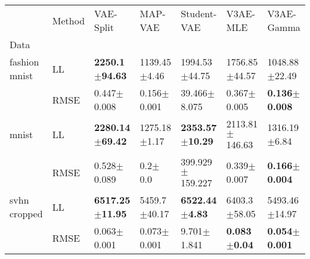 \begin{tabular}{lllllll}
\toprule
             & Method &                   VAE-Split &           MAP-VAE &                 Student-VAE &                 V3AE-MLE &                V3AE-Gamma \\
Data & {} &                             &                   &                             &                          &                           \\
\midrule
fashion mnist & LL &   \textbf{2250.1$\pm$94.63} &  1139.45$\pm$4.46 &           1994.53$\pm$44.75 &        1756.85$\pm$44.57 &         1048.88$\pm$22.49 \\
             & RMSE &             0.447$\pm$0.008 &   0.156$\pm$0.001 &            39.466$\pm$8.075 &          0.367$\pm$0.005 &  \textbf{0.136$\pm$0.008} \\
mnist & LL &  \textbf{2280.14$\pm$69.42} &  1275.18$\pm$1.17 &  \textbf{2353.57$\pm$10.29} &       2113.81$\pm$146.63 &          1316.19$\pm$6.84 \\
             & RMSE &             0.528$\pm$0.089 &       0.2$\pm$0.0 &         399.929$\pm$159.227 &          0.339$\pm$0.007 &  \textbf{0.166$\pm$0.004} \\
svhn cropped & LL &  \textbf{6517.25$\pm$11.95} &  5459.7$\pm$40.17 &   \textbf{6522.44$\pm$4.83} &         6403.3$\pm$58.05 &         5493.46$\pm$14.97 \\
             & RMSE &             0.063$\pm$0.001 &   0.073$\pm$0.001 &             9.701$\pm$1.841 &  \textbf{0.083$\pm$0.04} &  \textbf{0.054$\pm$0.001} \\
\bottomrule
\end{tabular}

